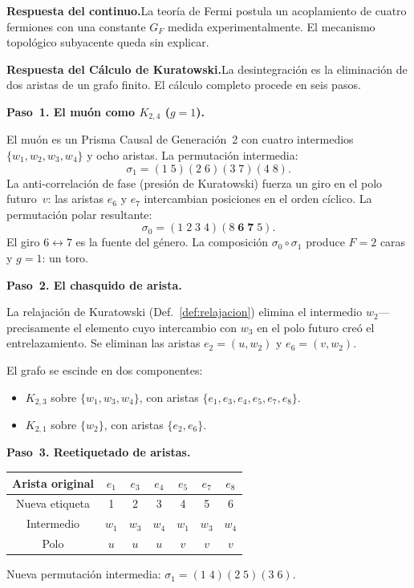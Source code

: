 \documentclass[11pt, a4paper, openany]{book}
\begin{document}
\noindent\textbf{Respuesta del continuo.}\enspace La teor\'ia de Fermi
postula un acoplamiento de cuatro fermiones con una constante $G_F$
medida experimentalmente. El mecanismo topol\'ogico subyacente queda sin
explicar.

\noindent\textbf{Respuesta del C\'alculo de Kuratowski.}\enspace La
desintegraci\'on es la eliminaci\'on de dos aristas de un grafo finito.
El c\'alculo completo procede en seis pasos.

\bigskip
\noindent
\textbf{Paso~1. El mu\'on como $K_{2,4}$ ($g = 1$).}

El mu\'on es un Prisma Causal de Generaci\'on~2 con cuatro intermedios
$\{w_1, w_2, w_3, w_4\}$ y ocho aristas. La permutaci\'on intermedia:
\[
  \sigma_1 = (1\;5)(2\;6)(3\;7)(4\;8).
\]
La anti-correlaci\'on de fase (presi\'on de Kuratowski) fuerza un giro
en el polo futuro~$v$: las aristas $e_6$ y $e_7$ intercambian posiciones
en el orden c\'iclico. La permutaci\'on polar resultante:
\[
  \sigma_0 = (1\;2\;3\;4)(8\;\mathbf{6\;7}\;5).
\]
El giro $6 \leftrightarrow 7$ es la fuente del g\'enero. La
composici\'on $\sigma_0 \circ \sigma_1$ produce $F = 2$ caras y
$g = 1$: un toro.

\bigskip
\noindent
\textbf{Paso~2. El chasquido de arista.}

La relajaci\'on de Kuratowski (Def.~\ref{def:relajacion}) elimina el
intermedio $w_2$---precisamente el elemento cuyo intercambio con $w_3$ en
el polo futuro cre\'o el entrelazamiento. Se eliminan las aristas
$e_2 = (u, w_2)$ y $e_6 = (v, w_2)$.

El grafo se escinde en dos componentes:
\begin{itemize}
  \item $K_{2,3}$ sobre $\{w_1, w_3, w_4\}$, con aristas
        $\{e_1, e_3, e_4, e_5, e_7, e_8\}$.
  \item $K_{2,1}$ sobre $\{w_2\}$, con aristas $\{e_2, e_6\}$.
\end{itemize}

\bigskip
\noindent
\textbf{Paso~3. Reetiquetado de aristas.}

\begin{center}
\renewcommand{\arraystretch}{1.15}
\begin{tabular}{ccccccc}
\toprule
Arista original & $e_1$ & $e_3$ & $e_4$ & $e_5$ & $e_7$ & $e_8$ \\
\midrule
Nueva etiqueta  & 1 & 2 & 3 & 4 & 5 & 6 \\
Intermedio      & $w_1$ & $w_3$ & $w_4$ & $w_1$ & $w_3$ & $w_4$ \\
Polo            & $u$ & $u$ & $u$ & $v$ & $v$ & $v$ \\
\bottomrule
\end{tabular}
\end{center}
Nueva permutaci\'on intermedia:
$\sigma_1 = (1\;4)(2\;5)(3\;6)$.
\end{document}
